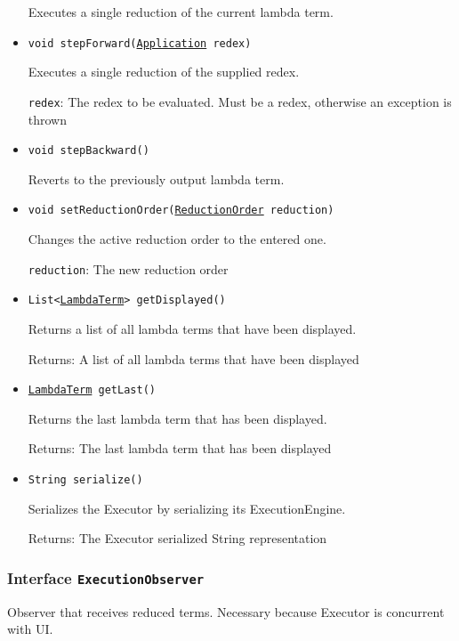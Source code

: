\begin{itemize}
Executes a single reduction of the current lambda term.

\item \texttt{void stepForward(\hyperref[type:edu.kit.wavelength.client.model.term.Application]{Application} redex)}

Executes a single reduction of the supplied redex.

\texttt{redex}: The redex to be evaluated. Must be a redex, otherwise
 an exception is thrown

\item \texttt{void stepBackward()}

Reverts to the previously output lambda term.

\item \texttt{void setReductionOrder(\hyperref[type:edu.kit.wavelength.client.model.reduction.ReductionOrder]{ReductionOrder} reduction)}

Changes the active reduction order to the entered one.

\texttt{reduction}: The new reduction order

\item \texttt{List<\hyperref[type:edu.kit.wavelength.client.model.term.LambdaTerm]{LambdaTerm}> getDisplayed()}

Returns a list of all lambda terms that have been displayed.

Returns: A list of all lambda terms that have been displayed

\item \texttt{\hyperref[type:edu.kit.wavelength.client.model.term.LambdaTerm]{LambdaTerm} getLast()}

Returns the last lambda term that has been displayed.

Returns: The last lambda term that has been displayed

\item \texttt{String serialize()}

Serializes the Executor by serializing its ExecutionEngine.

Returns: The Executor serialized String representation

\end{itemize}

\subsubsection{Interface \texttt{ExecutionObserver}}
\label{type:edu.kit.wavelength.client.view.execution.ExecutionObserver}
Observer that receives reduced terms. Necessary because Executor is concurrent with UI.

